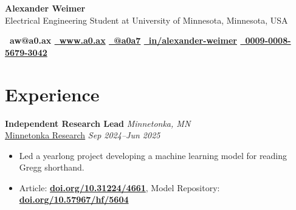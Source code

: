 \documentclass[11pt, letterpaper]{article}
\begin{document}
\vspace{2em}
\begin{center}
\vspace{2em}
\color{black}\LARGE{\textbf{Alexander Weimer}} \\
\vspace{0.4em}
\small{Electrical Engineering Student at University of Minnesota, Minnesota, USA} \\
\vspace{0.5em}

\small{\textbf{
  ~aw@a0.ax
  \quad
  \href{https://a0.ax/}{~www.a0.ax}
  \quad
  \href{https://github.com/a0a7}{~@a0a7}
  \quad
  \href{https://linkedin.com/in/alexander-weimer}{~in/alexander-weimer}
  \quad
  \href{https://orcid.org/0009-0008-5679-3042}{~0009-0008-5679-3042}
}}

\end{center}

\vspace{-1.5em}
\section{\Large{Experience}}

\noindent\textbf{{Independent Research Lead}} \hfill \textit{Minnetonka, MN}\\
\href{https://www.linkedin.com/school/minnetonka-research/}{Minnetonka Research} \hfill \textit{Sep 2024--Jun 2025}
\begin{itemize}
\item Led a yearlong project developing a machine learning model for reading Gregg shorthand.
\item Article: \textbf{\href{https://doi.org/10.31224/4661}{doi.org/10.31224/4661}}, Model Repository: \textbf{\href{https://doi.org/10.57967/hf/5604}{doi.org/10.57967/hf/5604}}
\end{itemize}
\end{document}
